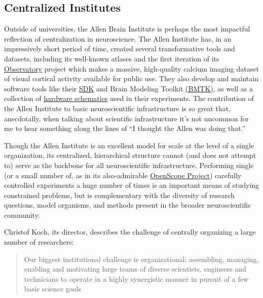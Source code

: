 \documentclass[notoc]{tufte-book}
\begin{document}
\subsection{Centralized Institutes}

Outside of universities, the Allen Brain Institute is perhaps the most
impactful reflection of centralization in neuroscience. The Allen
Institute has, in an impressively short period of time, created several
transformative tools and datasets, including its well-known atlases \citep{leinGenomewideAtlasGene2007}  and the first iteration of its
\href{http://observatory.brain-map.org/}{Observatory} project which
makes a massive, high-quality calcium imaging dataset of visual cortical
activity available for public use. They also develop and maintain
software tools like their
\href{https://allensdk.readthedocs.io/en/latest/}{SDK} and Brain
Modeling Toolkit \href{https://alleninstitute.github.io/bmtk/}{(BMTK)},
as well as a collection of
\href{https://portal.brain-map.org/explore/toolkit/hardware}{hardware
schematics} used in their experiments. The contribution of the Allen
Institute to basic neuroscientific infrastructure is so great that,
anecdotally, when talking about scientific infrastructure it's not
uncommon for me to hear something along the lines of ``I thought the
Allen was doing that.''

Though the Allen Institute is an excellent model for scale at the level
of a single organization, its centralized, hierarchical structure cannot
(and does not attempt to) serve as the backbone for all neuroscientific
infrastructure. Performing single (or a small number of, as in its
also-admirable
\href{https://alleninstitute.org/what-we-do/brain-science/news-press/articles/three-collaborative-studies-launch-openscope-shared-observatory-neuroscience}{OpenScope
Project}) carefully controlled experiments a huge number of times is an
important means of studying constrained problems, but is complementary
with the diversity of research questions, model organisms, and methods
present in the broader neuroscientific community.

Christof Koch, its director, describes the challenge of centrally
organizing a large number of researchers:

\begin{quote}
Our biggest institutional challenge is organizational: assembling,
managing, enabling and motivating large teams of diverse scientists,
engineers and technicians to operate in a highly synergistic manner in
pursuit of a few basic science goals \citep{grillnerWorldwideInitiativesAdvance2016} 
\end{quote}
\end{document}
